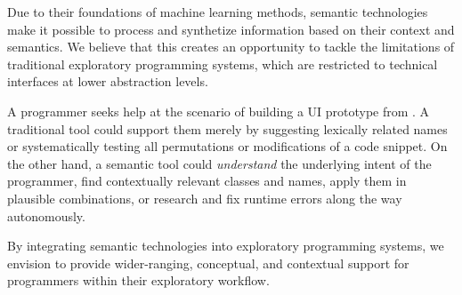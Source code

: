 \ParSep

Due to their foundations of machine learning methods, semantic technologies make it possible to process and synthetize information based on their context and semantics.
We believe that this creates an opportunity to tackle the limitations of traditional exploratory programming systems, which are restricted to technical interfaces at lower abstraction levels.

\begin{example}
	A programmer seeks help at the scenario of building a UI prototype from .
	A traditional tool could support them merely by suggesting lexically related names or systematically testing all permutations or modifications of a code snippet.
	On the other hand, a semantic tool could \emph{understand} the underlying intent of the programmer, find contextually relevant classes and names, apply them in plausible combinations, or research and fix runtime errors along the way autonomously.
\end{example}

By integrating semantic technologies into exploratory programming systems, we envision to provide wider-ranging, conceptual, and contextual support for programmers within their exploratory workflow.
